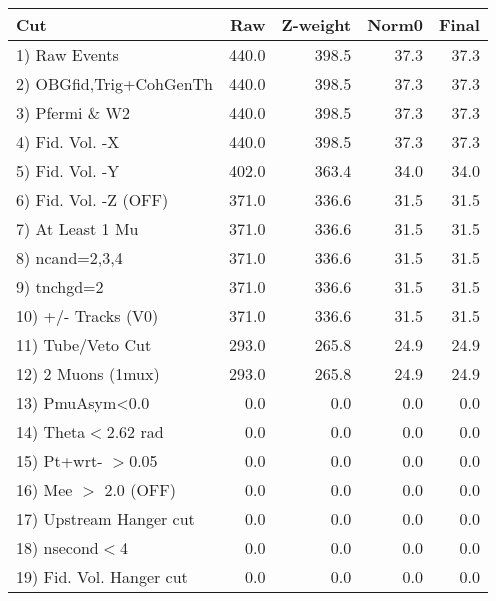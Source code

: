 \begin{table}[h!]\centering
 \begin{tabular}{||l||r|r|r|r||}
 \hline
 \hline
 Cut & Raw & Z-weight & Norm0 & Final \\
 \hline
  1) Raw Events           &       440.0 &       398.5 &        37.3 &        37.3 \\
  2) OBGfid,Trig+CohGenTh &       440.0 &       398.5 &        37.3 &        37.3 \\
  3) Pfermi \& W2         &       440.0 &       398.5 &        37.3 &        37.3 \\
  4) Fid. Vol. -X         &       440.0 &       398.5 &        37.3 &        37.3 \\
  5) Fid. Vol. -Y         &       402.0 &       363.4 &        34.0 &        34.0 \\
  6) Fid. Vol. -Z (OFF)   &       371.0 &       336.6 &        31.5 &        31.5 \\
  7) At Least 1 Mu        &       371.0 &       336.6 &        31.5 &        31.5 \\
  8) ncand=2,3,4          &       371.0 &       336.6 &        31.5 &        31.5 \\
  9) tnchgd=2             &       371.0 &       336.6 &        31.5 &        31.5 \\
 10) +/- Tracks (V0)      &       371.0 &       336.6 &        31.5 &        31.5 \\
 11) Tube/Veto Cut        &       293.0 &       265.8 &        24.9 &        24.9 \\
 12) 2 Muons (1mux)       &       293.0 &       265.8 &        24.9 &        24.9 \\
 13) PmuAsym<0.0          &         0.0 &         0.0 &         0.0 &         0.0 \\
 14) Theta$<$2.62 rad     &         0.0 &         0.0 &         0.0 &         0.0 \\
 15) Pt+wrt- $>$0.05      &         0.0 &         0.0 &         0.0 &         0.0 \\
 16) Mee $>$ 2.0  (OFF)   &         0.0 &         0.0 &         0.0 &         0.0 \\
 17) Upstream Hanger cut  &         0.0 &         0.0 &         0.0 &         0.0 \\
 18) nsecond$<$4          &         0.0 &         0.0 &         0.0 &         0.0 \\
 19) Fid. Vol. Hanger cut &         0.0 &         0.0 &         0.0 &         0.0 \\

\end{tabular}
\end{table}
